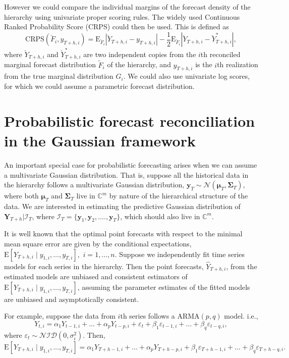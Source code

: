 \documentclass[a4paper, 11pt]{article}
\def\E{\text{E}}
\begin{document}
However we could compare the individual margins of the forecast density of the hierarchy using univariate proper scoring rules. The widely used Continuous Ranked Probability Score (CRPS) could then be used. This is defined as
\begin{equation} \label{eq:(3.6)}
\text{CRPS}(\breve{F}_i,y_{T+h,i}) = \E_{\breve{F}_i}|\breve{Y}_{T+h,i}-y_{T+h,i}| - \frac{1}{2}\E_{\breve{F}_i}|\breve{Y}_{T+h,i}-\breve{Y}^*_{T+h,i}|,
\end{equation}
where $\breve{Y}_{T+h,i}$ and $\breve{Y}^*_{T+h,i}$ are two independent copies from the $i$th reconciled marginal forecast distribution $\tilde{F}_i$ of the hierarchy, and $y_{T+h,i}$ is the $i$th realization from the true marginal distribution $G_i$. We could also use univariate log scores, for which we could assume a parametric forecast distribution.

\section{Probabilistic forecast reconciliation in the Gaussian framework}\label{sec:gaussian}

An important special case for probabilistic forecasting arises when we can assume a multivariate Gaussian distribution. That is, suppose all the historical data in the hierarchy follows a multivariate Gaussian distribution, $\bm{y}_T \sim \mathcal{N}(\bm{\mu}_T, \bm{\Sigma}_T)$, where both $\bm{\mu}_T$ and $\bm{\Sigma}_T$ live in $\mathbb{C}^m$ by nature of the hierarchical structure of the data. We are interested in estimating the predictive Gaussian distribution of $\bm{Y}_{T+h}| \bm{\mathcal{I}}_T$, where $\bm{\mathcal{I}}_T= \{\bm{y}_1,\bm{y}_2,\dots.,\bm{y}_T\}$, which should also live in $\mathbb{C}^m$.

It is well known that the optimal point forecasts with respect to the minimal mean square error are given by the conditional expectations, $\E[Y_{T+h,i}\mid y_{1,i},\dots,y_{T,i}],$ $i=1,\dots,n$. Suppose we independently fit time series models for each series in the hierarchy. Then the point forecasts, $\hat{Y}_{T+h,i}$, from the estimated models are unbiased and consistent estimators of $\E[Y_{T+h,i}\mid y_{1,i},\dots,y_{T,i}]$, assuming the parameter estimates of the fitted models are unbiased and asymptotically consistent. 

For example, suppose the data from $i$th series follows a ARMA$(p,q)$ model. i.e.,
$$
Y_{t,i}=\alpha_1Y_{t-1,i}+\dots+\alpha_pY_{t-p,i}+\varepsilon_t + \beta_1\varepsilon_{t-1,i}+\dots+\beta_q\varepsilon_{t-q,i},
$$
where $\varepsilon_t \sim \mathcal{NID}(0, \sigma_i^2)$. Then,
$$
\E[Y_{T+h,i}\mid y_{1,i},\dots,y_{T,i}] = \alpha_1Y_{T+h-1,i}+\dots+\alpha_pY_{T+h-p,i}+ \beta_1\varepsilon_{T+h-1,i}+\dots+\beta_q\varepsilon_{T+h-q,i}.
$$
\end{document}
